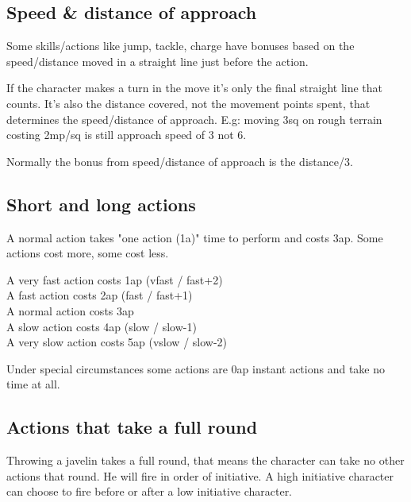 \subsection*{Speed \& distance of approach}
\label{approach}
Some skills/actions like jump, tackle, charge have bonuses based on the speed/distance moved in a straight line just before the action.

If the character makes a turn in the move it's only the final straight line that counts. It's also the distance covered, not the movement points spent, that determines the speed/distance of approach. E.g: moving 3sq on rough terrain costing 2mp/sq is still approach speed of 3 not 6.

Normally the bonus from speed/distance of approach is the distance/3.















\subsection*{Short and long actions}
A normal action takes "one action (1a)" time to perform and costs 3ap. Some actions cost more, some cost less.

\noindent
A very fast action costs 1ap (vfast / fast+2) \\
A fast action costs 2ap (fast / fast+1) \\
A normal action costs 3ap \\
A slow action costs 4ap (slow / slow-1) \\
A very slow action costs 5ap (vslow / slow-2)

\noindent
Under special circumstances some actions are 0ap instant actions and take no time at all.


\subsection*{Actions that take a full round}
\label{fullroundactions}
Throwing a javelin takes a full round, that means the character can take no other actions that round. He will fire in order of initiative. A high initiative character can choose to fire before or after a low initiative character.

